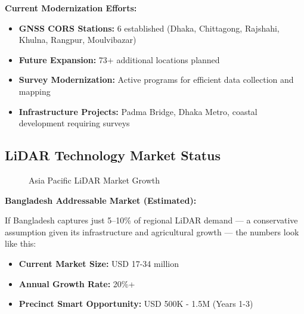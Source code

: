 \textbf{Current Modernization Efforts:}
\begin{itemize}
    \item \textbf{GNSS CORS Stations:} 6 established (Dhaka, Chittagong, Rajshahi, Khulna, Rangpur, Moulvibazar)
    \item \textbf{Future Expansion:} 73+ additional locations planned
    \item \textbf{Survey Modernization:} Active programs for efficient data collection and mapping
    \item \textbf{Infrastructure Projects:} Padma Bridge, Dhaka Metro, coastal development requiring surveys
\end{itemize}

\subsection{LiDAR Technology Market Status}

\begin{figure}[H]
    \centering
    \caption{Asia Pacific LiDAR Market Growth}
    \label{tab:lidar_market}
\end{figure}

\textbf{Bangladesh Addressable Market (Estimated):}

If Bangladesh captures just 5–10\% of regional LiDAR demand — a conservative assumption given its infrastructure and agricultural growth — the numbers look like this:
\begin{itemize}
    \item \textbf{Current Market Size:} USD 17-34 million
    \item \textbf{Annual Growth Rate:} 20\%+
    \item \textbf{Precinct Smart Opportunity:} USD 500K - 1.5M (Years 1-3)
\end{itemize}

